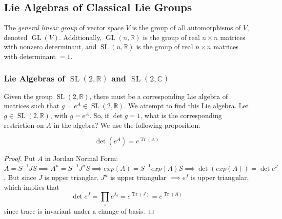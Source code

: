 \documentclass{article}
\DeclareMathOperator{\Tr}{Tr}
\DeclareMathOperator{\GL}{GL}
\DeclareMathOperator{\SL}{SL}
\begin{document}
  \subsection{Lie Algebras of Classical Lie Groups}

    \begin{definition}
    The \textit{general linear group} of vector space $V$ is the group of all automorphisms of $V$, denoted $\GL(V)$. Additionally, $\GL(n, \mathbb{R})$ is the group of real $n \times n$ matrices with nonzero determinant, and $\SL(n, \mathbb{R})$ is the group of real $n \times n$ matrices with determinant $= 1$.
    \end{definition}

    \subsubsection[Lie Algebras of SL(2, R) and SL(2, C)]{Lie Algebras of $\SL(2, \mathbb{R})$ and $\SL(2, \mathbb{C})$}
    Given the group $\SL(2, \mathbb{R})$, there must be a corresponding Lie algebra of matrices such that $g = e^A \in \SL(2, \mathbb{R})$. We attempt to find this Lie algebra. Let $g \in \SL(2, \mathbb{R})$, with $g = e^A$. So, if $\det{g} = 1$, what is the corresponding restriction on $A$ in the algebra? We use the following proposition. 

    \begin{proposition}
    \[\det{(e^A)} = e^{\Tr{(A)}}\]
    \end{proposition}
    \begin{proof}
    Put $A$ in Jordan Normal Form: $A = S^{-1} J S \implies A^n = S^{-1} J^n S \implies exp(A) = S^{-1} exp(A) S \implies \det{(exp(A))} = \det{e^J}$. But since $J$ is upper trianglar, $J^n$ is upper triangular $\implies e^J$ is upper triangular, which implies that 
    \[\det{e^J} = \prod_i e^{\lambda_i} = e^{\Tr{(J)}} = e^{\Tr{(A)}}\]
    since trace is invariant under a change of basis. 
    \end{proof}
\end{document}
